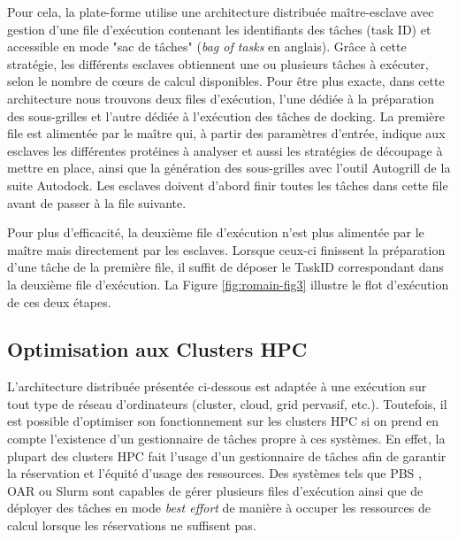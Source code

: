 Pour cela, la plate-forme utilise une architecture distribuée maître-esclave avec gestion d'une file d'exécution contenant les identifiants des tâches (task ID) et accessible en mode "sac de tâches" (\textit{bag of tasks} en anglais). Grâce à cette stratégie, les différents esclaves obtiennent une ou plusieurs tâches à exécuter, selon le nombre de c{\oe}urs de calcul disponibles. Pour être plus exacte, dans cette architecture nous trouvons deux files d'exécution, l'une dédiée à la préparation des sous-grilles et l'autre dédiée à l'exécution des tâches de docking. La première file est alimentée par le maître qui, à partir des paramètres d'entrée, indique aux esclaves les différentes protéines à analyser et aussi les stratégies de découpage à mettre en place, ainsi que la génération des sous-grilles avec l'outil Autogrill de la suite Autodock. Les esclaves doivent d'abord finir toutes les tâches dans cette file avant de passer à la file suivante.

Pour plus d'efficacité, la deuxième file d'exécution n'est plus alimentée par le maître mais directement par les esclaves. Lorsque ceux-ci finissent la préparation d'une tâche de la première file, il suffit de déposer le TaskID correspondant dans la deuxième file d'exécution. La Figure \ref{fig:romain-fig3} illustre le flot d'exécution de ces deux étapes.  


\subsection{Optimisation aux Clusters HPC}

 L'architecture distribuée présentée ci-dessous est adaptée à une exécution sur tout type de réseau d'ordinateurs (cluster, cloud, grid pervasif, etc.). Toutefois, il est possible d'optimiser son fonctionnement sur les clusters HPC si on prend en compte l'existence d'un gestionnaire de tâches propre à ces systèmes. En effet, la plupart des clusters HPC fait l'usage d'un gestionnaire de tâches afin de garantir la réservation et l'équité d'usage des ressources. Des systèmes tels que PBS \cite{Henderson95}, OAR \cite{Capit2005} ou Slurm \cite{Yoo2003} sont capables de gérer plusieurs files d'exécution ainsi que de déployer des tâches en mode \textit{best effort} de manière à occuper les ressources de calcul lorsque les réservations ne suffisent pas. 
 
